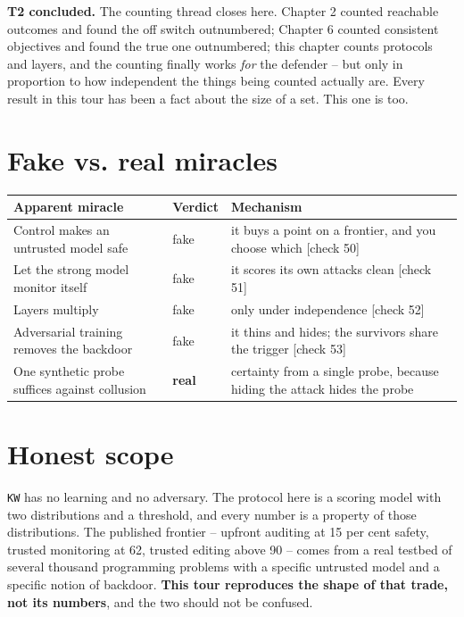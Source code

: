 \textbf{T2 concluded.} The counting thread closes here. Chapter 2 counted reachable outcomes and found the off switch outnumbered; Chapter 6 counted consistent objectives and found the true one outnumbered; this chapter counts protocols and layers, and the counting finally works \emph{for} the defender -- but only in proportion to how independent the things being counted actually are. Every result in this tour has been a fact about the size of a set. This one is too.

\section*{Fake vs. real miracles}

\noindent

\noindent
\begin{tabularx}{\textwidth}{XXX}
\toprule
Apparent miracle & Verdict & Mechanism \\
\midrule
Control makes an untrusted model safe & fake & it buys a point on a frontier, and you choose which [check 50] \\
Let the strong model monitor itself & fake & it scores its own attacks clean [check 51] \\
Layers multiply & fake & only under independence [check 52] \\
Adversarial training removes the backdoor & fake & it thins and hides; the survivors share the trigger [check 53] \\
One synthetic probe suffices against collusion & \textbf{real} & certainty from a single probe, because hiding the attack hides the probe \\
\bottomrule
\end{tabularx}
\par\medskip

\section*{Honest scope}

\texttt{KW} has no learning and no adversary. The protocol here is a scoring model with two distributions and a threshold, and every number is a property of those distributions. The published frontier -- upfront auditing at 15 per cent safety, trusted monitoring at 62, trusted editing above 90 -- comes from a real testbed of several thousand programming problems with a specific untrusted model and a specific notion of backdoor. \textbf{This tour reproduces the shape of that trade, not its numbers}, and the two should not be confused.

